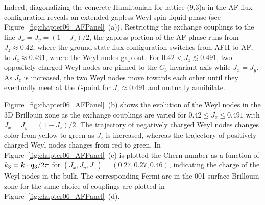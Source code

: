 Indeed, diagonalizing the concrete Hamiltonian for lattice (9,3)a in the AF flux configuration reveals an extended gapless Weyl spin liquid phase (see Figure~\ref{fig:chapter06_AFPanel}~(a)).
Restricting the exchange couplings to the line $J_x = J_y = (1 - J_z)/2$, the gapless portion of the AF phase runs from $J_z \approx 0.42$, where the ground state flux configuration switches from AFII to AF, to $J_z \approx 0.491$, where the Weyl nodes gap out.
For $0.42 < J_z \lesssim 0.491$, two oppositely charged Weyl nodes are pinned to the $C_3$-invariant axis while $J_x = J_y$.
As $J_z$ is increased, the two Weyl nodes move towards each other until they eventually meet at the $\Gamma$-point for $J_z \approx 0.491$ and mutually annihilate.

Figure~\ref{fig:chapter06_AFPanel}~(b) shows the evolution of the Weyl nodes in the 3D Brillouin zone as the exchange couplings are varied for $0.42 \leq J_z \leq 0.491$ with $J_x = J_y = (1 - J_z)/2$.
The trajectory of negatively charged Weyl nodes changes color from yellow to green as $J_z$ is increased, whereas the trajectory of positively charged Weyl nodes changes from red to green.
In Figure~\ref{fig:chapter06_AFPanel}~(c) is plotted the Chern number as a function of $k_3 = \bm{k} \cdot \bm{q}_3 / 2\pi$ for $(J_x, J_y, J_z) = (0.27, 0.27, 0.46)$, indicating the charge of the Weyl nodes in the bulk.
The corresponding Fermi arc in the 001-surface Brillouin zone for the same choice of couplings are plotted in Figure~\ref{fig:chapter06_AFPanel}~(d).

